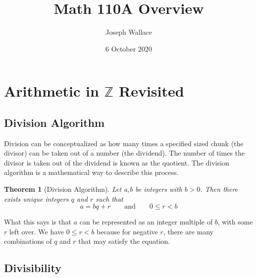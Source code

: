 \documentclass{article}
\title{Math 110A Overview}
\author{Joseph Wallace}
\date{6 October 2020}
\newtheorem{theorem}{Theorem}[section]
\begin{document}
    
    \maketitle

    \section{Arithmetic in $\mathbb{Z}$ Revisited}

    \subsection{Division Algorithm}
    Division can be conceptualized as how many times a specified sized chunk (the divisor) can be taken out of a number (the dividend).
    The number of times the divisor is taken out of the dividend is known as the quotient.
    The division algorithm is a mathematical way to describe this process.
    \begin{theorem}[Division Algorithm]
        Let a,b be integers with $b>0$. Then there exists unique integers $q$ and $r$ such that
        \begin{equation*}
            a=bq+r \qquad \textrm{and} \qquad 0 \leq r < b
        \end{equation*}
    \end{theorem}
    What this says is that $a$ can be represented as an integer multiple of $b$, with some $r$ left over.
    We have $0 \leq r < b$ because for negative $r$, there are many combinations of $q$ and $r$ that may satisfy the equation.

    \subsection{Divisibility}
    
\end{document}
